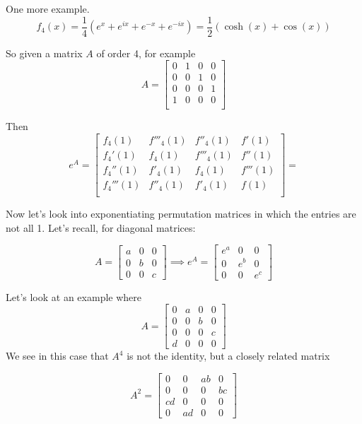 \documentclass{amsart}
\theoremstyle{definition}
\theoremstyle{remark}
\numberwithin{equation}{section}
\begin{document}
One more example.  
\[
f_4(x) = \frac{1}{4}(e^x + e^{ix}+ e^{-x}+e^{-ix}) = \frac{1}{2}(\cosh(x)+\cos(x))
\]


So given a matrix $A$ of order 4, for example
\[
A = \begin{bmatrix}
0 & 1 & 0 & 0\\
0 & 0 & 1 & 0\\
0 & 0 & 0 & 1\\
1 & 0 & 0 & 0\\
\end{bmatrix}
\]

Then \begin{equation}
e^A = \begin{bmatrix}
f_4(1) & f'''_4(1) & f''_4(1) & f'(1)\\
f_4'(1) & f_4(1) & f'''_4(1) & f''(1)\\
f_4''(1) & f'_4(1) & f_4(1) & f'''(1)\\
f_4'''(1) & f''_4(1) & f'_4(1) & f(1)\\
\end{bmatrix} = 
\end{equation}


Now let's look into exponentiating permutation matrices in which the entries are not all 1.  Let's recall, for diagonal matrices:

\[
A = \begin{bmatrix}
a & 0 & 0\\
0 & b & 0\\
0 & 0 & c
\end{bmatrix} \implies e^A = \begin{bmatrix}
e^a & 0 & 0\\
0 & e^b & 0\\
0 & 0 & e^c
\end{bmatrix}
\]


Let's look at an example where
\[
A = \begin{bmatrix}
0 & a & 0 & 0\\
0 & 0 & b & 0\\
0 & 0 & 0 & c\\
d & 0 & 0 & 0
\end{bmatrix}
\]
We see in this case that $A^4$ is not the identity, but a closely related matrix

\[
A^2 = \begin{bmatrix}
0 & 0 & ab & 0\\
0 & 0 & 0 & bc\\
cd & 0 & 0 & 0\\
0 & ad & 0 & 0
\end{bmatrix}
\]
\end{document}

